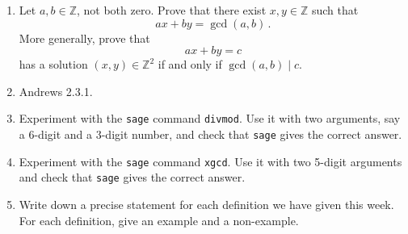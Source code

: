 \documentclass[11pt]{article}
\def\Z{\mathbb{Z}}
\def\sage{{\tt sage} }
\begin{document}
\begin{enumerate}
\item Let $a, b \in \Z$, not both zero.
Prove that there exist $x, y \in \Z$ such that
\[
  ax+by = \gcd(a,b) \, .
\]
More generally, prove that
\[
  ax+by = c
\]
has a solution $(x,y) \in \Z^2$ if and only if $\gcd(a,b) \mid c$.

\item Andrews 2.3.1.

\item Experiment with the \sage command {\tt divmod}.
Use it with two arguments, say a 6-digit and a 3-digit number, and check that \sage gives the correct answer.

\item Experiment with the \sage command {\tt xgcd}.
Use it with two 5-digit arguments and check that \sage gives the correct answer.

\item Write down a precise statement for each definition we have given this week.
For each definition, give an example and a non-example.

\end{enumerate}
\end{document}
